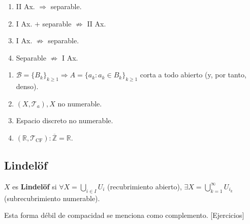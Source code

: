 \begin{prop}
\begin{enumerate}
    \item II Ax. $\Rightarrow$ separable. 
    \item I Ax. $+$ separable $\not \Rightarrow$ II Ax. 
    \item I Ax. $\not \Rightarrow$ separable. 
    \item Separable $\not \Rightarrow$ I Ax. 
\end{enumerate}
\end{prop}
\begin{demo}
\begin{enumerate}
    \item $\mathcal{B} = \{B_k\}_{k \ge 1} \Rightarrow A = \{a_k : a_k \in B_k\}_{k \ge 1}$ corta a todo abierto (y, por tanto, denso).
    \item $\left( X, \mathcal{T}_a \right), X$ no numerable.
    \item Espacio discreto no numerable.
    \item $\left( \mathbb{R}, \mathcal{T}_{\text{CF}} \right) : \overline{\mathbb{Z}} = \mathbb{R}$.
\end{enumerate}
\end{demo}

\subsection{Lindelöf}%
\label{sub:lindelof}
\begin{defi}[Lindelöf]
$X$ es \textbf{Lindelöf} si $\forall X = \bigcup_{i \in I} U_i$ (recubrimiento abierto), $\exists X = \bigcup_{k=1}^{\infty} U_{i_k}$ (subrecubrimiento numerable). 
\end{defi}

Esta forma débil de compacidad se menciona como complemento. [Ejercicios]

